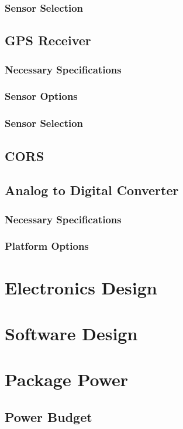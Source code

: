\documentclass[12pt]{report}
\begin{document}
			\subsubsection{Sensor Selection}
		\subsection{GPS Receiver}			
			\subsubsection{Necessary Specifications}
			\subsubsection{Sensor Options}
			\subsubsection{Sensor Selection}
			\newpage
		\subsection{CORS}
		\subsection{Analog to Digital Converter}
			\subsubsection{Necessary Specifications}					
			\subsubsection{Platform Options}
	\section{Electronics Design}
			
			
	\section{Software Design}
	\section{Package Power}
		\subsection{Power Budget}
\end{document}
